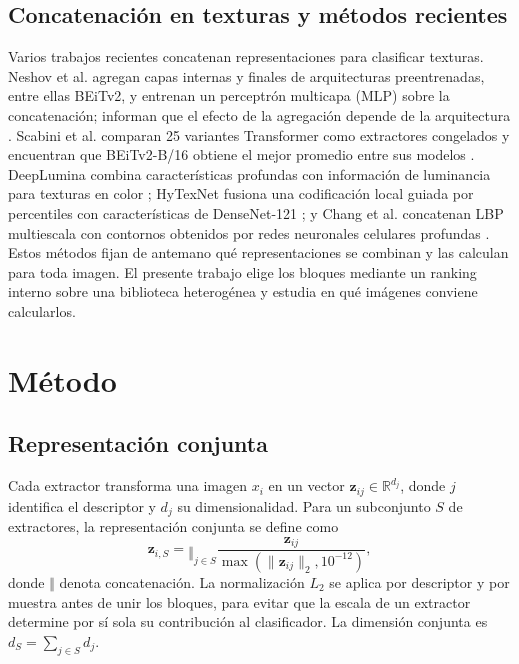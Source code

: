 \documentclass[a4paper,fleqn]{cas-sc}
\begin{document}
\subsection{Concatenación en texturas y métodos recientes}

Varios trabajos recientes concatenan representaciones para clasificar texturas. Neshov et al. agregan capas internas y finales de arquitecturas preentrenadas, entre ellas BEiTv2, y entrenan un perceptrón multicapa (MLP) sobre la concatenación; informan que el efecto de la agregación depende de la arquitectura \citep{neshov2025aggregation}. Scabini et al. comparan 25 variantes Transformer como extractores congelados y encuentran que BEiTv2-B/16 obtiene el mejor promedio entre sus modelos \citep{scabini2025survey}. DeepLumina combina características profundas con información de luminancia para texturas en color \citep{simon2022deeplumina}; HyTexNet fusiona una codificación local guiada por percentiles con características de DenseNet-121 \citep{gupta2026hytexnet}; y Chang et al. concatenan LBP multiescala con contornos obtenidos por redes neuronales celulares profundas \citep{chang2024cellnn}. Estos métodos fijan de antemano qué representaciones se combinan y las calculan para toda imagen. El presente trabajo elige los bloques mediante un ranking interno sobre una biblioteca heterogénea y estudia en qué imágenes conviene calcularlos.

\section{Método}\label{sec:metodo}

\subsection{Representación conjunta}

Cada extractor transforma una imagen $x_i$ en un vector $\mathbf{z}_{ij}\in\mathbb{R}^{d_j}$, donde $j$ identifica el descriptor y $d_j$ su dimensionalidad. Para un subconjunto $S$ de extractores, la representación conjunta se define como
\begin{equation}
 \mathbf{z}_{i,S}=\mathop{\Vert}_{j\in S}\frac{\mathbf{z}_{ij}}{\max(\lVert\mathbf{z}_{ij}\rVert_2,10^{-12})},
 \label{eq:concat}
\end{equation}
donde $\Vert$ denota concatenación. La normalización $L_2$ se aplica por descriptor y por muestra antes de unir los bloques, para evitar que la escala de un extractor determine por sí sola su contribución al clasificador. La dimensión conjunta es $d_S=\sum_{j\in S}d_j$.
\end{document}
